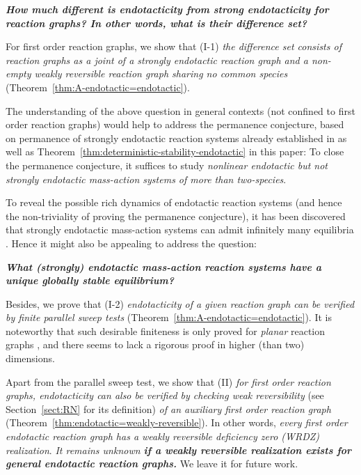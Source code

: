 \documentclass[10pt]{amsart}
\numberwithin{equation}{section}
\theoremstyle{plain}
\theoremstyle{definition}
\theoremstyle{remark}
\begin{document}
\noindent \emph{\textbf{How much different is endotacticity from strong endotacticity for reaction graphs? In other words, what is their difference set?}}
\smallskip

{For first order reaction graphs, we show that (I-1) \emph{the difference set consists of reaction graphs as a joint of a strongly endotactic reaction graph and a non-empty weakly reversible reaction graph sharing no common species} (Theorem~\ref{thm:A-endotactic=endotactic}).}


{The understanding of the above question in general contexts (not confined to first order reaction graphs) would help to address the permanence conjecture, based on permanence of  strongly endotactic reaction systems already  established in \cite{GMS14} as well as Theorem~\ref{thm:deterministic-stability-endotactic} in this paper:} To close the permanence conjecture, it suffices to study  \emph{nonlinear endotactic but not strongly endotactic mass-action systems of more than two-species}. 


To reveal the possible rich dynamics of endotactic reaction systems (and hence the non-triviality of proving the permanence conjecture), it has been discovered that strongly endotactic mass-action systems can admit infinitely many equilibria \cite{KD23}. Hence it might also be appealing to address the question: 
\smallskip

\noindent\emph{\textbf{What (strongly) endotactic mass-action reaction systems have a unique globally stable equilibrium?}}
\smallskip


Besides, we  prove that (I-2) \emph{endotacticity of a given reaction graph can be verified by  \emph{finite} parallel sweep tests} (Theorem~\ref{thm:A-endotactic=endotactic}). It is noteworthy that such desirable finiteness is only proved for \emph{planar} reaction graphs \cite[Proposition~4.1]{CNP13}, and there seems to lack a rigorous proof in higher (than two) dimensions. 

Apart from the  parallel sweep test, we show that (II) \emph{for first order reaction graphs, endotacticity can also be verified by checking \emph{weak reversibility}} (see Section~\ref{sect:RN} for its definition)
\emph{of an auxiliary first order reaction graph} (Theorem~\ref{thm:endotactic=weakly-reversible}). In other words, \emph{every  first order endotactic reaction graph has a weakly reversible deficiency zero (WRDZ) realization}.  \emph{It remains unknown \textbf{if a weakly reversible realization exists for general  endotactic reaction graphs.}} We leave it for future work.
\end{document}
